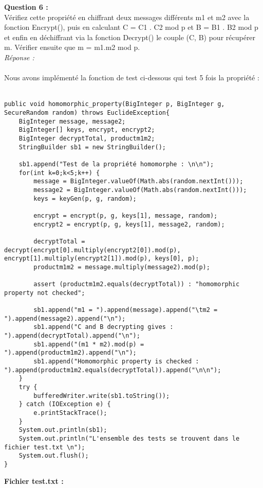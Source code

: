 \documentclass[a4paper,11pt]{article}
\begin{document}
    \textbf{Question 6 : \\}Vérifiez cette propriété en chiffrant deux messages différents m1 et m2 avec la fonction Encrypt(), puis en calculant C = C1 . C2 mod p et B = B1 . B2 mod p et enfin en déchiffrant via la fonction Decrypt() le couple (C, B) pour récupérer m. Vérifier ensuite que m = m1.m2 mod p.
    \textit{\\Réponse :} \\\\Nous avons implémenté la fonction de test ci-dessous qui test 5 fois la propriété : \\\\\begin{lstlisting}
public void homomorphic_property(BigInteger p, BigInteger g, SecureRandom random) throws EuclideException{
    BigInteger message, message2;
    BigInteger[] keys, encrypt, encrypt2;
    BigInteger decryptTotal, productm1m2;
    StringBuilder sb1 = new StringBuilder();

    sb1.append("Test de la propriété homomorphe : \n\n");
    for(int k=0;k<5;k++) {
        message = BigInteger.valueOf(Math.abs(random.nextInt()));
        message2 = BigInteger.valueOf(Math.abs(random.nextInt()));
        keys = keyGen(p, g, random);

        encrypt = encrypt(p, g, keys[1], message, random);
        encrypt2 = encrypt(p, g, keys[1], message2, random);

        decryptTotal = decrypt(encrypt[0].multiply(encrypt2[0]).mod(p), encrypt[1].multiply(encrypt2[1]).mod(p), keys[0], p);
        productm1m2 = message.multiply(message2).mod(p);

        assert (productm1m2.equals(decryptTotal)) : "homomorphic property not checked";

        sb1.append("m1 = ").append(message).append("\tm2 = ").append(message2).append("\n");
        sb1.append("C and B decrypting gives : ").append(decryptTotal).append("\n");
        sb1.append("(m1 * m2).mod(p) = ").append(productm1m2).append("\n");
        sb1.append("Homomorphic property is checked : ").append(productm1m2.equals(decryptTotal)).append("\n\n");
    }
    try {
        bufferedWriter.write(sb1.toString());
    } catch (IOException e) {
        e.printStackTrace();
    }
    System.out.println(sb1);
    System.out.println("L'ensemble des tests se trouvent dans le fichier test.txt \n");
    System.out.flush();
}
    \end{lstlisting}
    \textbf{Fichier test.txt : }
\end{document}
